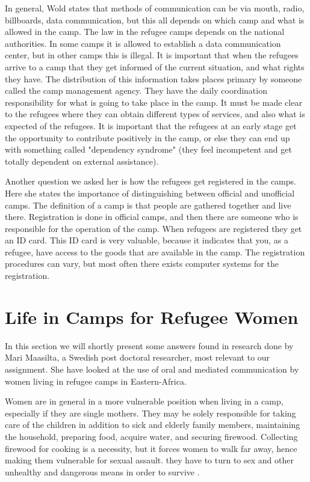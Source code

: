 In general, Wold states that methods of communication can be via mouth, radio, billboards, data communication, but this all depends on which camp and what is allowed in the camp. The law in the refugee camps depends on the national authorities. In some camps it is allowed to establish a data communication center, but in other camps this is illegal. It is important that when the refugees arrive to a camp that they get informed of the current situation, and what rights they have. The distribution of this information takes places primary by someone called the camp management agency. They have the daily coordination responsibility for what is going to take place in the camp. It must be made clear to the refugees where they can obtain different types of services, and also what is expected of the refugees. It is important that the refugees at an early stage get the opportunity to contribute positively in the camp, or else they can end up with something called "dependency syndrome" (they feel incompetent and get totally dependent on external assistance). 

Another question we asked her is how the refugees get registered in the camps. Here she states the importance of distinguishing between official and unofficial camps. The definition of a camp is that people are gathered together and live there. Registration is done in official camps, and then there are someone who is responsible for the operation of the camp. When refugees are registered they get an ID card. This ID card is very valuable, because it indicates that you, as a refugee, have access to the goods that are available in the camp. The registration procedures can vary, but most often there exists computer systems for the registration.


\section{Life in Camps for Refugee Women}
In this section we will shortly present some answers found in research done by Mari Maasilta, a Swedish post doctoral researcher, most relevant to our assignment. She have looked at the use of oral and mediated communication by women living in refugee camps in Eastern-Africa. 

Women are in general in a more vulnerable position when living in a  camp, especially if they are single mothers. They may be solely responsible for taking care of the children in addition to sick and elderly family members, maintaining the household, preparing food, acquire water, and securing firewood. Collecting firewood for cooking is a necessity, but it forces women  to walk far away, hence making them vulnerable for sexual assault. they have to turn to sex and other unhealthy and dangerous means in order to survive \cite{womenRefugee}. 

